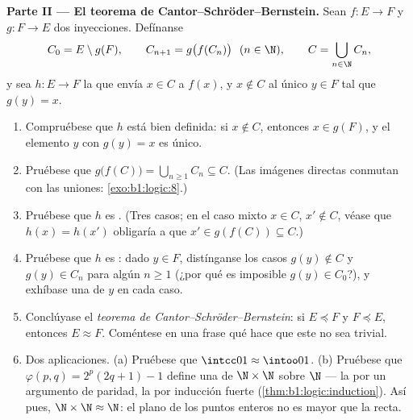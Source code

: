 \begin{problem}
\medskip
\noindent\textbf{Parte II --- El teorema de
Cantor--Schröder--Bernstein.} Sean $f \colon E \to F$ y
$g \colon F \to E$ dos inyecciones. Defínanse
\[
C_0 = E \setminus g(F), \qquad C_{n+1} = g\bigl(f(C_n)\bigr)
\ \ (n \in \N), \qquad C = \bigcup_{n \in \N} C_n,
\]
y sea $h \colon E \to F$ la  que envía $x \in C$ a $f(x)$, y
$x \notin C$ al único $y \in F$ tal que $g(y) = x$.
\begin{enumerate}[resume]
  \item Compruébese que $h$ está bien definida: si $x \notin C$,
        entonces $x \in g(F)$, y el elemento $y$ con $g(y) = x$ es único.
  \item Pruébese que $g\bigl(f(C)\bigr) = \bigcup_{n \geq 1} C_n
        \subseteq C$. (Las imágenes directas conmutan con las uniones:
        \cref{exo:b1:logic:8}.)
  \item Pruébese que $h$ es . (Tres casos; en el caso mixto
        $x \in C$, $x' \notin C$, véase que $h(x) = h(x')$ obligaría a
        que $x' \in g(f(C)) \subseteq C$.)
  \item Pruébese que $h$ es : dado $y \in F$, distínganse
        los casos $g(y) \notin C$ y $g(y) \in C_n$ para algún $n
        \geq 1$ (¿por qué es imposible $g(y) \in C_0$?), y exhíbase una
         de $y$ en cada caso.
  \item Conclúyase el \emph{teorema de
        Cantor--Schröder--Bernstein}: si $E \preceq F$ y $F \preceq E$,
        entonces $E \approx F$. Coméntese en una frase qué hace que este
         no sea trivial.
  \item Dos aplicaciones. (a) Pruébese que $\intcc01 \approx \intoo01$.
        (b) Pruébese que $\varphi(p, q) = 2^p(2q + 1) - 1$ define una
         de $\N \times \N$ sobre $\N$ --- la  por un
        argumento de paridad, la  por inducción fuerte
        (\cref{thm:b1:logic:induction}). Así pues, $\N \times \N \approx
        \N$: el plano de los puntos enteros no es mayor que la recta.
\end{enumerate}


\end{problem}
